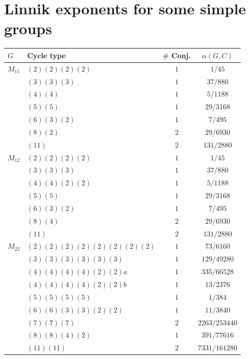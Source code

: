 \documentclass[12pt]{amsart}
\theoremstyle{definition} \newtheorem{definition}[theorem]{Definition}
\theoremstyle{example} \newtheorem{example}[theorem]{Example}
\theoremstyle{remark} \newtheorem{remark}{Remark}[theorem]
\numberwithin{equation}{section}
\numberwithin{theorem}{section}
\begin{document}
\clearpage

\section{Linnik exponents for some simple groups}
	

	{\tiny
	\begin{table}[h]
		\begin{minipage}[t]{0.49\textwidth}
		\begin{tabular}{|l|l|c|c|} \hline
			$G$ & Cycle type & $\#$ Conj. & $\alpha(G,C)$ \\ \hline
			$M_{11}$ 
				& $(2)(2)(2)(2)$ & $1$ & $1/45$ \\
				& $(3)(3)(3)$ & $1$ & $37/880$ \\
				& $(4)(4)$ & $1$ & $5/1188$ \\
				& $(5)(5)$ & $1$ & $29/3168$ \\
				& $(6)(3)(2)$ & $1$ & $7/495$ \\
				& $(8)(2)$ & $2$ & $29/6930$ \\
				& $(11)$ & $2$ & ${131/2880}$ \\ \hline
			$M_{12}$
				& $(2)(2)(2)(2)$ & $1$ & $1/45$ \\
				& $(3)(3)(3)$ & $1$ & $37/880$ \\
				& $(4)(4)(2)(2)$ & $1$ & $5/1188$ \\
				& $(5)(5)$ & $1$ & $29/3168$ \\
				& $(6)(3)(2)$ & $1$ & $7/495$ \\
				& $(8)(4)$ & $2$ & $29/6930$ \\
				& $(11)$ & $2$ & ${131/2880}$ \\ \hline
			$M_{22}$
				& $(2)(2)(2)(2)(2)(2)(2)(2)$ & $1$ & $73/6160$ \\
				& $(3)(3)(3)(3)(3)(3)$ & $1$ & $129/49280$ \\
				& $(4)(4)(4)(4)(2)(2)a$ & $1$ & $335/66528$ \\
				& $(4)(4)(4)(4)(2)(2)b$ & $1$ & $13/2376$ \\
				& $(5)(5)(5)(5)$ & $1$ & $1/384$ \\
				& $(6)(6)(3)(3)(2)(2)$ & $1$ & $11/3840$ \\
				& $(7)(7)(7)$ & $2$ & $2263/253440$ \\
				& $(8)(8)(4)(2)$ & $1$ & $391/77616$ \\
				& $(11)(11)$ & $2$ & ${7331/161280}$ \\ \hline
		\end{tabular}

\end{minipage}
\end{table}}
\end{document}

